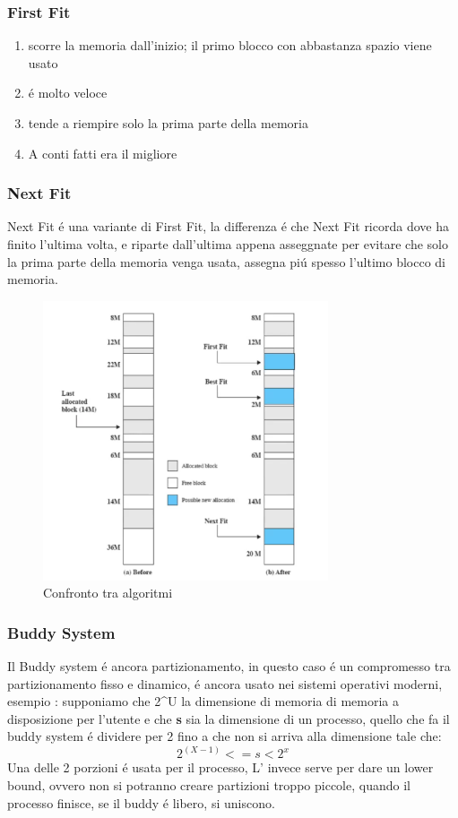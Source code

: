     \subsubsection*{First Fit}
    \begin{enumerate}
        \item scorre la memoria dall'inizio; il primo blocco con abbastanza spazio viene usato
        \item é molto veloce
        \item tende a riempire solo la prima parte della memoria
        \item A conti fatti era il migliore
    \end{enumerate}
    \subsubsection{Next Fit}
    Next Fit é una variante di First Fit, la differenza é che Next Fit ricorda dove ha finito l'ultima volta, e riparte
    dall'ultima appena asseggnate per evitare che solo la prima parte della memoria venga usata, assegna piú spesso
    l'ultimo blocco di memoria.
    \begin{figure}[H]
        \centering
        \includegraphics[width=0.75\textwidth]{immagini/AlgoritmiPartizionamento}
        \caption{Confronto tra algoritmi}
    \end{figure}
    \subsubsection{Buddy System}
    Il Buddy system é ancora partizionamento, in questo caso é un compromesso tra partizionamento fisso e dinamico,
    é ancora usato nei sistemi operativi moderni, esempio : supponiamo che 2^U la dimensione di memoria di memoria
    a disposizione per l'utente e che \textbf{s} sia la dimensione di un processo, quello che fa il buddy system é
    dividere per 2 fino a che non si arriva alla dimensione tale che:
    \begin{equation}
        2^(X-1) <= s <2^x
    \end{equation}
    Una delle 2 porzioni é usata per il processo, L' invece serve per dare un lower bound, ovvero non si potranno creare
    partizioni troppo piccole, quando il processo finisce, se il buddy é libero, si uniscono.\\

